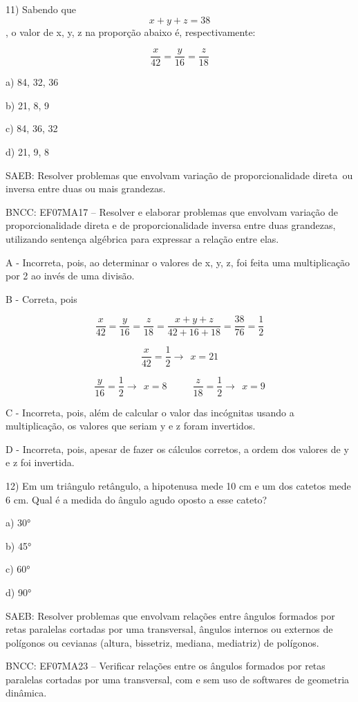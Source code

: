 11) Sabendo que \[x + y + z = 38\], o valor de x, y, z na proporção
abaixo é, respectivamente:

\[\frac{x}{42} = \frac{y}{16} = \frac{z}{18}\]

a) 84, 32, 36

b) 21, 8, 9

c) 84, 36, 32

d) 21, 9, 8

SAEB: Resolver problemas que envolvam variação de proporcionalidade
direta~ou inversa entre duas ou mais grandezas.

BNCC: EF07MA17 -- Resolver e elaborar problemas que envolvam variação de
proporcionalidade direta e de proporcionalidade inversa entre duas
grandezas, utilizando sentença algébrica para expressar a relação entre
elas.

A - Incorreta, pois, ao determinar o valores de x, y, z, foi feita uma
multiplicação por 2 ao invés de uma divisão.

B - Correta, pois

\[\frac{x}{42} = \frac{y}{16} = \frac{z}{18} = \frac{x + y + z}{42 + 16 + 18} = \frac{38}{76} = \frac{1}{2}\]

\[\frac{x}{42} = \frac{1}{2} \rightarrow \ \ x = 21\]

\[\frac{y}{16} = \frac{1}{2} \rightarrow \ \ x = 8\ \ \ \ \ \ \ \ \ \ \ \ \frac{z}{18} = \frac{1}{2} \rightarrow \ \ x = 9\]

C - Incorreta, pois, além de calcular o valor das incógnitas usando a
multiplicação, os valores que seriam y e z foram invertidos.

D - Incorreta, pois, apesar de fazer os cálculos corretos, a ordem dos
valores de y e z foi invertida.

12) Em um triângulo retângulo, a hipotenusa mede 10 cm e um dos catetos
mede 6 cm. Qual é a medida do ângulo agudo oposto a esse cateto?

a) 30°

b) 45°

c) 60°

d) 90°

SAEB: Resolver problemas que envolvam relações entre ângulos formados
por retas paralelas cortadas por uma transversal, ângulos internos ou
externos de polígonos ou cevianas (altura, bissetriz, mediana,
mediatriz) de polígonos.

BNCC: EF07MA23 -- Verificar relações entre os ângulos formados por retas
paralelas cortadas por uma transversal, com e sem uso de softwares de
geometria dinâmica.

